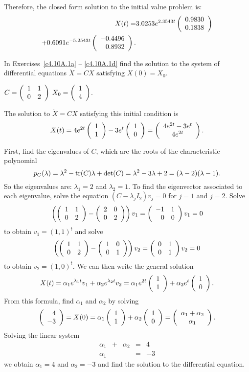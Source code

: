 \documentclass{ximera}
\begin{document}
Therefore, the closed form solution to the initial value problem is:
\begin{align*}
  X(t) = & 3.0253 e^{2.3543t}\left(\begin{array}{r} 0.9830 \\ 0.1838\end{array}\right) \\
  + 0.6091 e^{-5.2543t}\left(\begin{array}{r} -0.4496 \\ 0.8932\end{array}\right).
\end{align*}

\EXER

\TEXER

\noindent In Exercises~\ref{c4.10A.1a} -- \ref{c4.10A.1d} find the solution
to the system of differential equations $\dot{X} = CX$ satisfying $X(0)=X_0$.
\begin{exercise}  \label{c4.10A.1a}
$C = \left(\begin{array}{rr} 1 & 1\\ 0 &2\end{array}\right)$ \AND $X_0 = \left(\begin{array}{r} 1 \\ 4\end{array}\right)$.

\begin{solution}
\ans The solution to $\dot{X} = CX$ satisfying this
initial condition is
\[
X(t) = 4e^{2t}\left(\begin{array}{r} 1 \\ 1\end{array}\right) - 3e^t\left(\begin{array}{r} 1 \\ 0\end{array}\right)
= \left(\begin{array}{c} 4e^{2t} - 3e^t \\ 4e^{2t}\end{array}\right).
\]

\soln First, find the eigenvalues of $C$, which are the roots of the
characteristic polynomial
\[
p_C(\lambda) = \lambda^2 - {\rm tr}(C)\lambda + \det(C) =
\lambda^2 - 3\lambda + 2 = (\lambda - 2)(\lambda - 1).
\]
So the eigenvalues are: $\lambda_1 = 2$ and $\lambda_2 = 1$.
To find the eigenvector associated to each eigenvalue, solve
the equation $(C - \lambda_jI_2)v_j = 0$ for $j = 1$ and $j = 2$.  Solve
\[
\left(\left(\begin{array}{rr} 1 & 1\\ 0 &2\end{array}\right) - \left(\begin{array}{rr} 2 & 0\\ 0 &2\end{array}\right)\right)v_1 =
\left(\begin{array}{rr} -1 & 1\\ 0 &0\end{array}\right)v_1 = 0
\]
to obtain $v_1 = (1,1)^t$ and solve
\[
\left(\left(\begin{array}{rr} 1 & 1\\ 0 &2\end{array}\right) - \left(\begin{array}{rr} 1 & 0\\ 0 &1\end{array}\right)\right)v_2 =
\left(\begin{array}{rr} 0 & 1\\ 0 &1\end{array}\right)v_2 = 0
\]
to obtain $v_2 = (1,0)^t$.  We can then write the general solution
\[
X(t) = \alpha_1e^{\lambda_1 t}v_1 + \alpha_2e^{\lambda_2 t}v_2
= \alpha_1e^{2t}\left(\begin{array}{r} 1 \\ 1\end{array}\right) + \alpha_2e^t\left(\begin{array}{r} 1 \\ 0\end{array}\right).
\]
From this formula, find $\alpha_1$ and $\alpha_2$ by solving
\[
\left(\begin{array}{r} 4 \\ -3\end{array}\right) = X(0) = \alpha_1\left(\begin{array}{r} 1 \\ 1\end{array}\right) + \alpha_2\left(\begin{array}{r} 1 \\ 0\end{array}\right) =
\left(\begin{array}{c} \alpha_1 + \alpha_2 \\ \alpha_1\end{array}\right).
\]
Solving the linear system
\[
\begin{array}{rrrrr}
\alpha_1 & + & \alpha_2 & = & 4 \\
\alpha_1 & & & = & -3
\end{array}
\]
we obtain $\alpha_1 = 4$ and $\alpha_2 = -3$ and find the
solution to the differential equation.


\end{solution}
\end{exercise}
\end{document}
